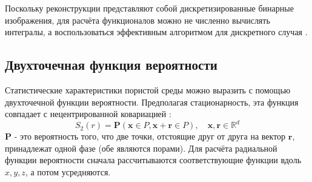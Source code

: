 		Поскольку реконструкции представляют собой дискретизированные бинарные изображения, для расчёта функционалов можно не численно вычислять интегралы, а воспользоваться эффективным алгоритмом для дискретного случая \cite{Blasquez}.
	
	\subsection{Двухточечная функция вероятности}
		
		Статистические характеристики пористой среды можно выразить с помощью двухточечной функции вероятности. Предполагая стационарность, эта функция совпадает с нецентрированной ковариацией \cite{Matheron, Mosser}:
		$$ S_2(r) = \boldsymbol{P}(\boldsymbol{x} \in P, \boldsymbol{x}+\boldsymbol{r} \in P), \quad \boldsymbol{x}, \boldsymbol{r} \in \mathbb{R}^d $$
		$\boldsymbol{P}$ - это вероятность того, что две точки, отстоящие друг от друга на вектор $\boldsymbol{r}$, принадлежат одной фазе (обе являются порами). Для расчёта радиальной функции вероятности сначала рассчитываются соответствующие функции вдоль $x, y, z$, а потом усредняются. 